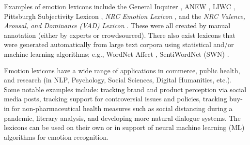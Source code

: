 \documentclass[11pt]{article}
\begin{document}
Examples of emotion lexicons include the General Inquirer \cite{Stone66}, ANEW \cite{nielsen2011new,bradley1999affective}, LIWC \cite{pennebaker2001linguistic},
Pittsburgh Subjectivity Lexicon \cite{wilson2005recognizing}, \textit{NRC Emotion Lexicon} \cite{MohammadT10,MohammadT13}, 
and the \textit{NRC Valence, Arousal, and Dominance (VAD) Lexicon} \cite{vad-acl2018}.
These were all created by manual annotation (either by experts or crowdsourced).
There also exist lexicons that were generated automatically from large text corpora using  statistical and/or machine learning algorithms; e.g., WordNet Affect \cite{strapparava2004wordnet}, SentiWordNet (SWN) \cite{baccianella2010sentiwordnet}.


Emotion lexicons have 
a wide range of applications in commerce, public health, and research (in NLP, Psychology, Social Sciences, Digital Humanities, etc.). 
Some notable examples include: tracking brand and product perception via social media posts, tracking support for controversial issues and policies, tracking buy-in for non-pharmaceutical health measures such as social distancing during a pandemic, literary analysis, and developing more natural dialogue systems. 
The lexicons can be used on their own or in support of neural machine learning (ML) algorithms for emotion recognition.
\end{document}
